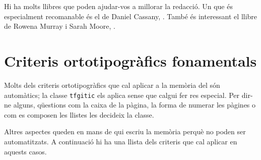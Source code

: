 \documentclass{tfgitic}[2024/07/01]
\begin{document}
Hi ha molts llibres que poden ajudar-vos a millorar la redacció. Un
que és especialment recomanable és el de Daniel Cassany,
\cite{cassany95:_la_cuina}. També és interessant el llibre de Rowena
Murray i Sarah Moore, \cite{murray06:_handb_academ_writin}.


\chapter{Criteris ortotipogràfics fonamentals}
\label{cap:ortotipografia}


\noindent
Molts dels criteris ortotipogràfics que cal aplicar a la memòria del
 són automàtics; la classe \texttt{tfgitic} els aplica sense
que calgui fer res especial. Per dir-ne alguns, qüestions com la caixa
de la pàgina, la forma de numerar les pàgines o com es composen les
llistes les decideix la classe.

Altres aspectes queden en mans de qui escriu la memòria perquè no
poden ser automatitzats. A continuació hi ha una llista dels criteris
que cal aplicar en aquests casos.
\end{document}
